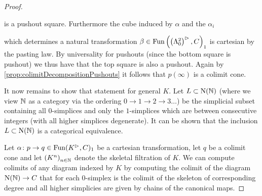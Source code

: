 \begin{lemma}
\begin{proof}
\begin{center}
        \end{center}
        is a pushout square.
        Furthermore the cube induced by $\alpha$ and the $\alpha_i$
        \begin{center}
        \end{center}
        which determines a natural transformation $\beta\in\operatorname{Fun}\left(\left(\Lambda_0^2\right)^{\rhd},C\right)_1$ is cartesian by the pasting law.
        By universality for pushouts (since the bottom square is pushout) we thus have that the top square is also a pushout.
        Again by \cref{prop:colimitDecompositionPushouts} it follows that $p(\infty)$ is a colimit cone.

        It now remains to show that statement for general $K$.
        Let $L\subset\operatorname{N}(\mathbb{N})$ (where we view $\mathbb{N}$ as a category via the ordering $0\to1\to2\to3\ldots$) be the simplicial subset containing all $0$-simplices and only the $1$-simplices which are between consecutive integers (with all higher simplices degenerate).
        It can be shown that the inclusion $L\subset\operatorname{N}(\mathbb{N})$ is a categorical equivalence. %

        Let $\alpha\colon p\to q\in\operatorname{Fun}(K^{\rhd},C)_1$ be a cartesian transformation, let $q$ be a colimit cone and let $\left(K^n\right)_{n\in\mathbb{N}}$ denote the skeletal filtration of $K$.
        We can compute colimits of any diagram indexed by $K$ by computing the colimit of the diagram $\operatorname{N}(\mathbb{N})\to C$ that for each $0$-simplex is the colimit of the skeleton of corresponding degree and all higher simplicies are given by chains of the canonical maps. 


\end{proof}
\end{lemma}
